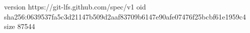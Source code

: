 version https://git-lfs.github.com/spec/v1
oid sha256:0639537fa5c3d21147b509d2aaf83709b6147e90afe07476f25bcbf61e1959c4
size 87544
